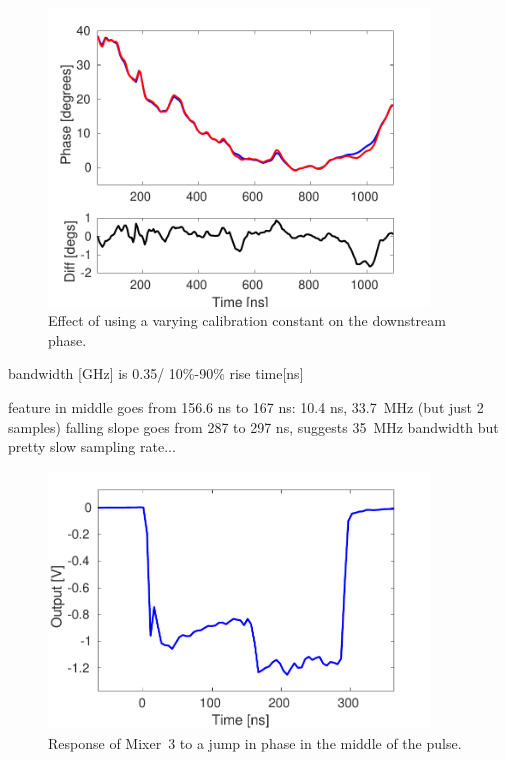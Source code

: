 \begin{figure}
  \centering
  \includegraphics[width=0.9\textwidth]{Figures/phaseMons/multiSampMon3Along}
  \caption{Effect of using a varying calibration constant on the downstream phase.}
  \label{f:multiSampMon3Along}
\end{figure}


bandwidth [GHz] is 0.35/ 10\%-90\% rise time[ns]

feature in middle goes from 156.6 ns to 167 ns: 10.4 ns, 33.7~MHz (but just 2 samples)
falling slope goes from 287 to 297 ns, suggests 35~MHz bandwidth
but pretty slow sampling rate...


\begin{figure}
  \centering
  \includegraphics[width=0.9\textwidth]{Figures/phaseMons/bandwidthPlot}
  \caption{Response of Mixer~3 to a jump in phase in the middle of the pulse.}
  \label{f:bandwidthPlot}
\end{figure}

